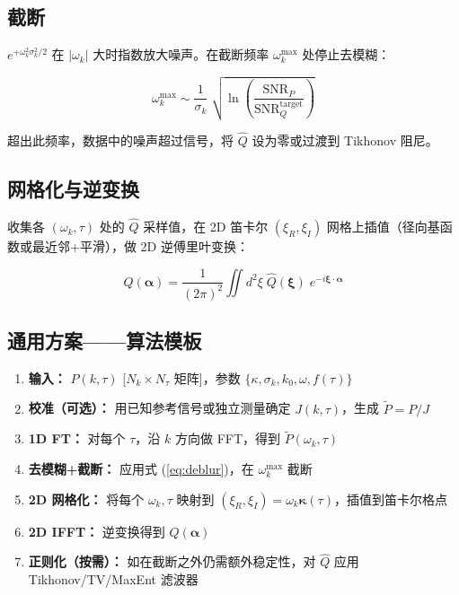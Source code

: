 \documentclass[12pt,a4paper]{ctexart}
\begin{document}
\subsection{截断}

$e^{+\omega_k^2\sigma_k^2/2}$ 在 $|\omega_k|$ 大时指数放大噪声。在截断频率 $\omega_k^{\max}$ 处停止去模糊：

\begin{equation}
\omega_k^{\max} \sim \frac{1}{\sigma_k}\;\sqrt{\ln\!\left(\frac{\text{SNR}_P}{\text{SNR}_Q^{\text{target}}}\right)}
\end{equation}

超出此频率，数据中的噪声超过信号，将 $\hat{Q}$ 设为零或过渡到 Tikhonov 阻尼。

\subsection{网格化与逆变换}

收集各 $(\omega_k,\tau)$ 处的 $\hat{Q}$ 采样值，在 2D 笛卡尔 $(\xi_R,\xi_I)$ 网格上插值（径向基函数或最近邻+平滑），做 2D 逆傅里叶变换：

\begin{equation}
Q(\boldsymbol{\alpha}) = \frac{1}{(2\pi)^2}\iint d^2\xi\;
\hat{Q}(\boldsymbol{\xi})\; e^{-i\boldsymbol{\xi}\cdot\boldsymbol{\alpha}}
\end{equation}

\subsection{通用方案——算法模板}

\begin{enumerate}[nosep]
  \item \textbf{输入：} $P(k,\tau)$ [$N_k\!\times\!N_\tau$ 矩阵]，参数 $\{\kappa,\sigma_k,k_0,\omega,f(\tau)\}$
  \item \textbf{校准（可选）：} 用已知参考信号或独立测量确定 $J(k,\tau)$，生成 $\tilde{P} = P/J$
  \item \textbf{1D FT：} 对每个 $\tau$，沿 $k$ 方向做 FFT，得到 $\tilde{P}(\omega_k,\tau)$
  \item \textbf{去模糊+截断：} 应用式 (\ref{eq:deblur})，在 $\omega_k^{\max}$ 截断
  \item \textbf{2D 网格化：} 将每个 $\omega_k,\tau$ 映射到 $(\xi_R,\xi_I) = \omega_k\boldsymbol{\kappa}(\tau)$，插值到笛卡尔格点
  \item \textbf{2D IFFT：} 逆变换得到 $Q(\boldsymbol{\alpha})$
  \item \textbf{正则化（按需）：} 如在截断之外仍需额外稳定性，对 $\hat{Q}$ 应用 Tikhonov/TV/MaxEnt 滤波器
\end{enumerate}
\end{document}
